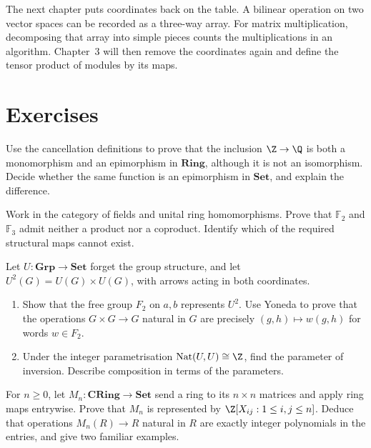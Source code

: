 The next chapter puts coordinates back on the table. A bilinear operation on two vector spaces can be recorded as a three-way array. For matrix multiplication, decomposing that array into simple pieces counts the multiplications in an algorithm. Chapter~3 will then remove the coordinates again and define the tensor product of modules by its maps.

\section{Exercises}

\begin{exercise}[$\star$]\label{ex:zq}
Use the cancellation definitions to prove that the inclusion $\Z\to\Q$ is both a monomorphism and an epimorphism in $\mathbf{Ring}$, although it is not an isomorphism. Decide whether the same function is an epimorphism in $\mathbf{Set}$, and explain the difference.
\end{exercise}

\begin{exercise}[$\star$]\label{ex:nofieldproduct}
Work in the category of fields and unital ring homomorphisms. Prove that $\mathbb F_2$ and $\mathbb F_3$ admit neither a product nor a coproduct. Identify which of the required structural maps cannot exist.
\end{exercise}

\begin{exercise}[$\star\star$]\label{ex:words}
Let $U:\mathbf{Grp}\to\mathbf{Set}$ forget the group structure, and let $U^2(G)=U(G)\times U(G)$, with arrows acting in both coordinates.
\begin{enumerate}[label=(\alph*)]
\item Show that the free group $F_2$ on $a,b$ represents $U^2$. Use Yoneda to prove that the operations $G\times G\to G$ natural in $G$ are precisely $(g,h)\mapsto w(g,h)$ for words $w\in F_2$.
\item Under the integer parametrisation $\operatorname{Nat}(U,U)\cong\Z$, find the parameter of inversion. Describe composition in terms of the parameters.
\end{enumerate}
\end{exercise}

\begin{exercise}[$\star$]\label{ex:matrixpoly}
For $n\ge0$, let $M_n:\mathbf{CRing}\to\mathbf{Set}$ send a ring to its $n\times n$ matrices and apply ring maps entrywise. Prove that $M_n$ is represented by $\Z[X_{ij}:1\le i,j\le n]$. Deduce that operations $M_n(R)\to R$ natural in $R$ are exactly integer polynomials in the entries, and give two familiar examples.
\end{exercise}

